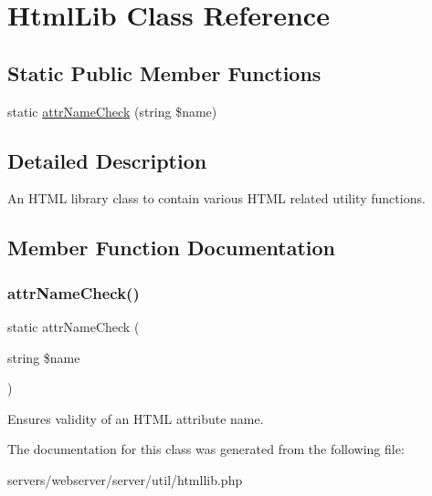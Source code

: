 \hypertarget{class_html_1_1_html_lib}{}\section{Html\+Lib Class Reference}
\label{class_html_1_1_html_lib}
\subsection*{Static Public Member Functions}
\begin{DoxyCompactItemize}
\item 
static \hyperlink{class_html_1_1_html_lib_a53ec3d81bbf119ac8be017abed712c32}{attr\+Name\+Check} (string \$name)
\end{DoxyCompactItemize}


\subsection{Detailed Description}
An H\+T\+ML library class to contain various H\+T\+ML related utility functions. 

\subsection{Member Function Documentation}
\mbox{\label{class_html_1_1_html_lib_a53ec3d81bbf119ac8be017abed712c32}} 
\subsubsection{\texorpdfstring{attr\+Name\+Check()}{attrNameCheck()}}
{\footnotesize\ttfamily static attr\+Name\+Check (\begin{DoxyParamCaption}\item[{string}]{\$name }\end{DoxyParamCaption})\hspace{0.3cm}{\ttfamily [static]}}

Ensures validity of an H\+T\+ML attribute name. 


The documentation for this class was generated from the following file\+:\begin{DoxyCompactItemize}
\item 
servers/webserver/server/util/htmllib.\+php\end{DoxyCompactItemize}
